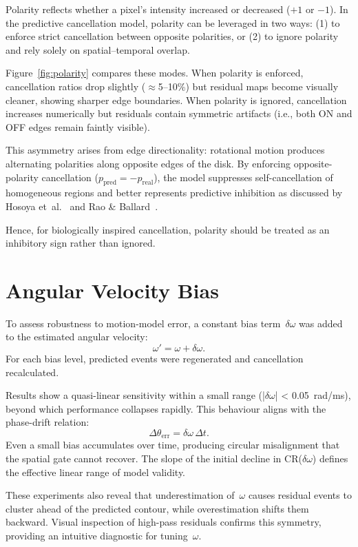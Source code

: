 Polarity reflects whether a pixel’s intensity increased or decreased (\(+1\) or \(-1\)).
In the predictive cancellation model, polarity can be leveraged in two ways:
(1) to enforce strict cancellation between opposite polarities, or 
(2) to ignore polarity and rely solely on spatial–temporal overlap.

Figure~\ref{fig:polarity} compares these modes.
When polarity is enforced, cancellation ratios drop slightly (\(\approx\)5–10\%) but residual maps become visually cleaner, showing sharper edge boundaries.
When polarity is ignored, cancellation increases numerically but residuals contain symmetric artifacts (i.e., both ON and OFF edges remain faintly visible).

This asymmetry arises from edge directionality:
rotational motion produces alternating polarities along opposite edges of the disk.
By enforcing opposite-polarity cancellation (\(p_{\text{pred}} = -p_{\text{real}}\)), the model suppresses self-cancellation of homogeneous regions and better represents predictive inhibition as discussed by Hosoya et~al.~\cite{Hosoya2005Dynamic} and Rao \& Ballard~\cite{Rao1999Predictive}.

Hence, for biologically inspired cancellation, polarity should be treated as an inhibitory sign rather than ignored.

\section{Angular Velocity Bias}
\label{sec:omega_bias}

To assess robustness to motion-model error, a constant bias term~\(\delta\omega\) was added to the estimated angular velocity:
\[
\omega' = \omega + \delta\omega.
\]
For each bias level, predicted events were regenerated and cancellation recalculated.

Results show a quasi-linear sensitivity within a small range (|\(\delta\omega\)| < 0.05~rad/ms), beyond which performance collapses rapidly.
This behaviour aligns with the phase-drift relation:
\[
\Delta\theta_{\text{err}} = \delta\omega\,\Delta t.
\]
Even a small bias accumulates over time, producing circular misalignment that the spatial gate cannot recover.
The slope of the initial decline in CR(\(\delta\omega\)) defines the effective linear range of model validity.

These experiments also reveal that underestimation of~\(\omega\) causes residual events to cluster ahead of the predicted contour, while overestimation shifts them backward.
Visual inspection of high-pass residuals confirms this symmetry, providing an intuitive diagnostic for tuning~\(\omega\).

